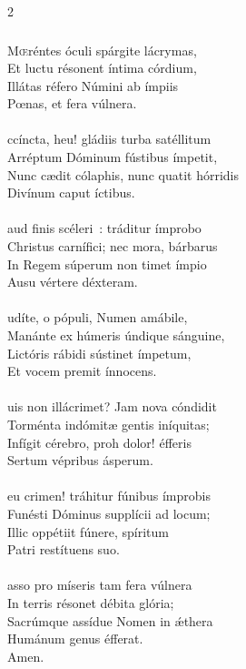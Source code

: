 \documentclass[9pt,twoside]{extarticle}
\begin{document}
\begin{multicols}{2}
{{{\subsubsection*{\center {}}
\lettrine{M}œréntes óculi spárgite lácrymas,\\
Et luctu résonent íntima córdium,\\
Illátas réfero Númini ab ímpiis\\
Pœnas, et fera vúlnera.\\
\\
ccíncta, heu! gládiis turba satéllitum\\
Arréptum Dóminum fústibus ímpetit,\\
Nunc cædit cólaphis, nunc quatit hórridis\\
Divínum caput íctibus.\\
\\
aud finis scéleri~: tráditur ímprobo\\
Christus carnífici; nec mora, bárbarus\\
In Regem súperum non timet ímpio\\
Ausu vértere déxteram.\\
\\
udíte, o pópuli, Numen amábile,\\
Manánte ex húmeris úndique sánguine,\\
Lictóris rábidi sústinet ímpetum,\\
Et vocem premit ínnocens.\\
\\
uis non illácrimet? Jam nova cóndidit\\
Torménta indómitæ gentis iníquitas;\\
Infígit cérebro, proh dolor! éfferis\\
Sertum vépribus ásperum.\\
\\
eu crimen! tráhitur fúnibus ímprobis\\
Funésti Dóminus supplícii ad locum;\\
Illic oppétiit fúnere, spíritum\\
Patri restítuens suo.\\
\\
asso pro míseris tam fera vúlnera\\
In terris résonet débita glória;\\
Sacrúmque assídue Nomen in ǽthera\\
Humánum genus éfferat.\\
Amen.

}}}
\end{multicols}
\end{document}
